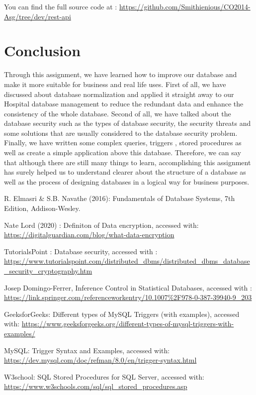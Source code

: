 \documentclass[a4paper]{article}
\numberwithin{equation}{section}
\begin{document}
You can find the full source code at :  \url{https://github.com/Smithienious/CO2014-Asg/tree/dev/rest-api}

\section{Conclusion}
Through this assignment, we have learned how to improve our database and make it more suitable for business and real life uses. First of all, we have discussed about database normalization  and applied it straight away to our Hospital database management to reduce the redundant data and enhance the consistency of the whole database. Second of all, we have talked about the database security such as the types of database security, the security threats and some solutions that are usually considered to the database security problem. Finally, we have written some complex queries, triggers , stored procedures as well as create a simple application above this database. Therefore, we can say that although there are still many things to learn, accomplishing this assignment has surely helped us to understand clearer about the structure of a database as well as the process of designing databases in a logical way for business purposes.
       
\pagebreak
\begin{thebibliography}{9}
  R. Elmasri \& S.B. Navathe (2016): Fundamentals of Database Systems, 7th
  Edition, Addison-Wesley.
  
  Nate Lord (2020) : Definiton of Data encryption, accessed with: \url{https://digitalguardian.com/blog/what-data-encryption}
  
  TutorialsPoint : Database security, accessed with : \url{https://www.tutorialspoint.com/distributed_dbms/distributed_dbms_database_security_cryptography.htm} 
  
  Josep Domingo-Ferrer, Inference Control in Statistical Databases, accessed with : \url{https://link.springer.com/referenceworkentry/10.1007\%2F978-0-387-39940-9_203}
  
  GeeksforGeeks: Different types of MySQL Triggers (with examples), accessed with: \url{https://www.geeksforgeeks.org/different-types-of-mysql-triggers-with-examples/}
  
  MySQL: Trigger Syntax and Examples, accessed with: \url{https://dev.mysql.com/doc/refman/8.0/en/trigger-syntax.html}
  
  W3school: SQL Stored Procedures for SQL Server, accessed with: \url{https://www.w3schools.com/sql/sql_stored_procedures.asp}
  
\end{thebibliography}
\end{document}
